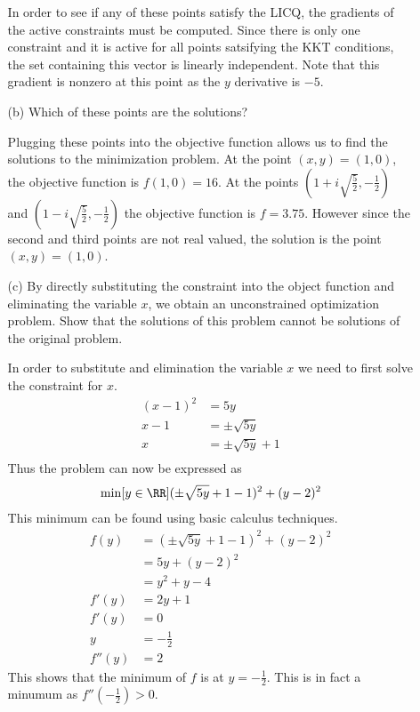 \documentclass[11pt, oneside]{article}
\begin{document}
\begin{enumerate}
\begin{enumerate}
        In order to see if any of these points satisfy the LICQ, the gradients
        of the active constraints must be computed.
        Since there is only one constraint and it is active for all points
        satsifying the KKT conditions, the set containing this vector is
        linearly independent.
        Note that this gradient is nonzero at this point as the $y$ derivative
        is $-5$.

      \item[(b)] %
        Which of these points are the solutions?

        Plugging these points into the objective function allows us to find the
        solutions to the minimization problem.
        At the point $(x, y) = (1, 0)$, the objective function is $f(1, 0) = 16$.
        At the points $(1 + i\sqrt{\frac{5}{2}}, -\frac{1}{2})$ and $(1 - i\sqrt{\frac{5}{2}}, -\frac{1}{2})$ the
        objective function is $f = 3.75$.
        However since the second and third points are not real valued, the
        solution is the point $(x, y) = (1, 0)$.

      \item[(c)] %
        By directly substituting the constraint into the object function and
        eliminating the variable $x$, we obtain an unconstrained optimization
        problem.
        Show that the solutions of this problem cannot be solutions of the
        original problem.

        In order to substitute and elimination the variable $x$ we need to first
        solve the constraint for $x$.
        \begin{align*}
          (x - 1)^2 &= 5y \\
          x - 1 &= \pm\sqrt{5y} \\
          x &= \pm\sqrt{5y} + 1 \\
        \end{align*}
        Thus the problem can now be expressed as
        \[
          \min[y \in \RR]{(\pm\sqrt{5y} + 1 - 1)^2 + (y - 2)^2}
        \]
        This minimum can be found using basic calculus techniques.
        \begin{align*}
          f(y) &= (\pm\sqrt{5y} + 1 - 1)^2 + (y - 2)^2 \\
          &= 5y + (y - 2)^2 \\
          &= y^2 + y - 4 \\
          f'(y) &= 2y + 1 \\
          f'(y) &= 0 \\
          y &= -\frac{1}{2} \\
          f''(y) &= 2
        \end{align*}
        This shows that the minimum of $f$ is at $y = -\frac{1}{2}$.
        This is in fact a minumum as $f''(-\frac{1}{2}) > 0$.


\end{enumerate}
\end{enumerate}
\end{document}
